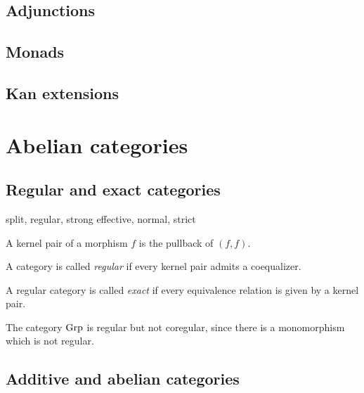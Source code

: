 \documentclass{../../large}
\begin{document}
\section{Adjunctions}

\section{Monads}

\section{Kan extensions}



\chapter{Abelian categories}
\section{Regular and exact categories}

split, regular, strong
effective, normal, strict

A kernel pair of a morphism $f$ is the pullback of $(f,f)$.

A category is called \emph{regular} if every kernel pair admits a coequalizer.

\begin{prb}
A regular category is called \emph{exact} if every equivalence relation is given by a kernel pair.
\begin{parts}
\item
\end{parts}
\end{prb}

The category $\mathrm{Grp}$ is regular but not coregular, since there is a monomorphism which is not regular.








\section{Additive and abelian categories}
\end{document}
